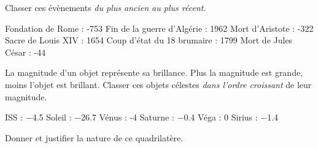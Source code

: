 \documentclass[../Cours.tex]{subfiles}
\begin{document}
\clearpage
\thispagestyle{empty}

\color{black}
\nomPrenom
\titreDS

\begin{questions}
    \question Classer ces évènements \textit{du plus ancien au plus récent}.\vspace{-1em}
        \begin{multicols}{2}
        \subquestion Fondation de Rome : -753
        \subquestion Fin de la guerre d'Algérie : 1962
        \subquestion Mort d'Aristote : -322
        \subquestion Sacre de Louis XIV : 1654
        \subquestion Coup d'état du 18 brumaire : 1799
        \subquestion Mort de Jules César : -44
        \end{multicols} 
    \question La magnitude d'un objet représente sa brillance. Plus la magnitude est grande, moins l'objet est brillant. Classer ces objets célestes \textit{dans l'ordre croissant} de leur magnitude.\vspace{-1em}
        \begin{multicols}{3}
        \subquestion ISS : \num{-4.5}
        \subquestion Soleil : \num{-26.7}
        \subquestion Vénus : -4
        \subquestion Saturne : \num{-0.4}
        \subquestion Véga : 0
        \subquestion Sirius : \num{-1.4}
        \end{multicols}

    \question Donner et justifier la nature de ce quadrilatère.

    \begin{centre}
    \end{centre}


\end{questions}
\end{document}
